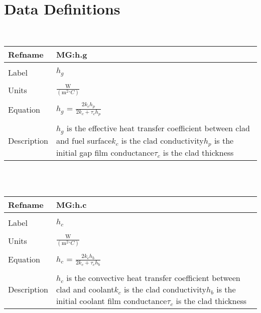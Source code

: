 \documentclass[12pt]{article}
\begin{document}
\section{Data Definitions}
\label{Sec:DD}
~\newline
\noindent \begin{minipage}{\textwidth}
\begin{tabular}{p{} p{}}
\toprule \textbf{Refname} & \textbf{MG:h.g}
\label{MG:h.g}
\\ \midrule \\
Label & $h_{g}$
\\ \midrule \\
Units & $\frac{\text{W}}{(\text{m}^{2}{}^{\circ}C)}$
\\ \midrule \\
Equation & $h_{g}$ = $\frac{2k_{c}h_{p}}{2k_{c}+\tau{}_{c}h_{p}}$
\\ \midrule \\
Description & $h_{g}$ is the effective heat transfer coefficient between clad and fuel surface\newline$k_{c}$ is the clad conductivity\newline$h_{p}$ is the initial gap film conductance\newline$\tau{}_{c}$ is the clad thickness
\\ \bottomrule \end{tabular}
\end{minipage}\\
~\newline
\noindent \begin{minipage}{\textwidth}
\begin{tabular}{p{} p{}}
\toprule \textbf{Refname} & \textbf{MG:h.c}
\label{MG:h.c}
\\ \midrule \\
Label & $h_{c}$
\\ \midrule \\
Units & $\frac{\text{W}}{(\text{m}^{2}{}^{\circ}C)}$
\\ \midrule \\
Equation & $h_{c}$ = $\frac{2k_{c}h_{b}}{2k_{c}+\tau{}_{c}h_{b}}$
\\ \midrule \\
Description & $h_{c}$ is the convective heat transfer coefficient between clad and coolant\newline$k_{c}$ is the clad conductivity\newline$h_{b}$ is the initial coolant film conductance\newline$\tau{}_{c}$ is the clad thickness
\\ \bottomrule \end{tabular}
\end{minipage}\\
\end{document}
